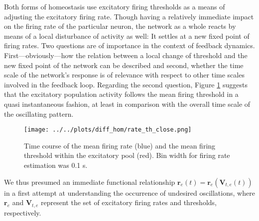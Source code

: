 \documentclass[10pt,a4paper]{article}
\begin{document}
Both forms of homeostasis use excitatory firing thresholds as a means of adjusting the excitatory firing rate. Though having a relatively immediate impact on the firing rate of the particular neuron, the network as a whole reacts by means of a local disturbance of activity as well: It settles at a new fixed point of firing rates. Two questions are of importance in the context of feedback dynamics. First---obviously---how the relation between a local change of threshold and the new fixed point of the network can be described and second, whether the time scale of the network's response is of relevance with respect to other time scales involved in the feedback loop. Regarding the second question, Figure \ref{rate_th_close} suggests that the excitatory population activity follows the mean firing threshold in a quasi instantaneous fashion, at least in comparison with the overall time scale of the oscillating pattern.
\begin{figure}
\begin{center}
\texttt{[image: ../../plots/diff\_hom/rate\_th\_close.png]}
\end{center}
\caption{Time course of the mean firing rate (blue) and the mean firing threshold within the excitatory pool (red). Bin width for firing rate estimation was 0.1 s.}
\label{rate_th_close}
\end{figure}
We thus presumed an immediate functional relationship $\mathbf{r}_e (t) = \mathbf{r}_e (\mathbf{V}_{t,e} (t))$ in a first attempt at understanding the occurrence of undesired oscillations, where $\mathbf{r}_e$ and $\mathbf{V}_{t,e}$ represent the set of excitatory firing rates and thresholds, respectively.
\end{document}
